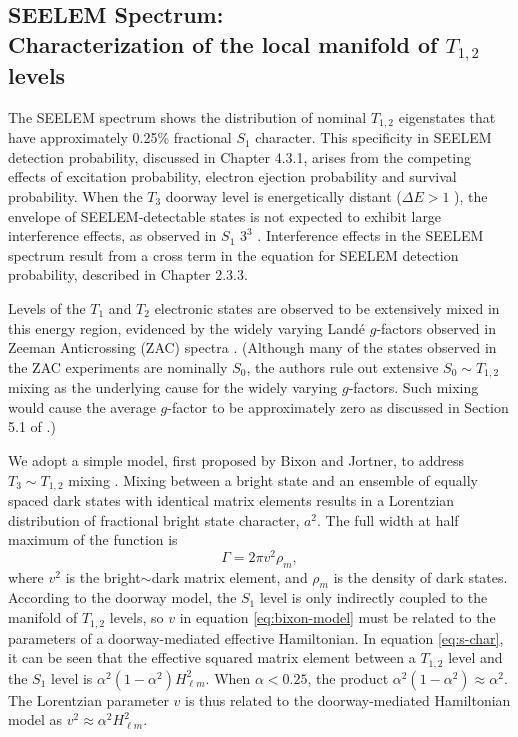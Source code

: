 \documentclass[12pt]{mitthesis}
\begin{document}



\subsection{SEELEM Spectrum: \\Characterization of the local manifold of
  $T_{1,2}$ levels}

The SEELEM spectrum shows the distribution of nominal $T_{1,2}$
eigenstates that have approximately 0.25\% fractional $S_1$ character.
This specificity in SEELEM detection probability, discussed in Chapter
4.3.1, arises from the competing effects of excitation probability,
electron ejection probability and survival probability.  When the
$T_3$ doorway level is energetically distant ($\Delta E > 1$ \rcm),
the envelope of SEELEM-detectable states is not expected to exhibit
large interference effects, as observed in $S_1$ $3^3$ .
Interference effects in the SEELEM spectrum result from a cross term
in the equation for SEELEM detection probability, described in Chapter
2.3.3.

Levels of the $T_1$ and $T_2$ electronic states are observed to be
extensively mixed in this energy region, evidenced by the widely
varying Land\'{e} $g$-factors observed in Zeeman Anticrossing (ZAC)
spectra \cite{dupre95a}.  (Although many of the states observed in the
ZAC experiments are nominally $S_0$, the authors rule out extensive
$S_0 \sim T_{1,2}$ mixing as the underlying cause for the widely
varying $g$-factors.  Such mixing would cause the average $g$-factor
to be approximately zero as discussed in Section 5.1 of
\cite{dupre95a}.)

We adopt a simple model, first proposed by Bixon and Jortner, to
address $T_3 \sim T_{1,2}$ mixing \cite{bixon68}.  Mixing between a
bright state and an ensemble of equally spaced dark states with
identical matrix elements results in a Lorentzian distribution of
fractional bright state character, $a^2$.  The full width at half
maximum of the function is
\begin{equation}
  \label{eq:bixon-model}
  \Gamma = 2 \pi v^2 \rho_m,
\end{equation}
where $v^2$ is the bright$\sim$dark matrix element, and $\rho_m$ is
the density of dark states.  According to the doorway model, the $S_1$
level is only indirectly coupled to the manifold of $T_{1,2}$ levels,
so $v$ in equation \ref{eq:bixon-model} must be related to the
parameters of a doorway-mediated effective Hamiltonian.  In equation
\ref{eq:s-char}, it can be seen that the effective squared matrix
element between a $T_{1,2}$ level and the $S_1$ level is $\alpha^2 (1
- \alpha^2) H_{\ell m}^2$.  When $\alpha < 0.25$, the product
$\alpha^2 (1 - \alpha^2) \approx \alpha^2$.  The Lorentzian parameter
$v$ is thus related to the doorway-mediated Hamiltonian model as $v^2
\approx \alpha^2 H_{\ell m}^2$.
\end{document}
